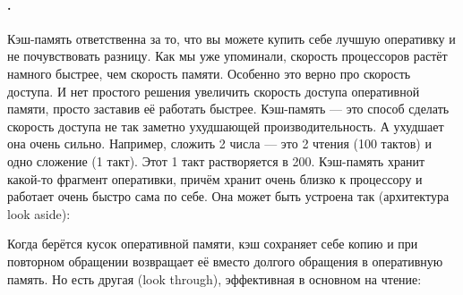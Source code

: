 \documentclass{article}
\begin{document}
    \paragraph{.}
    Кэш-память ответственна за то, что вы можете купить себе лучшую оперативку и не почувствовать разницу. Как мы уже упоминали, скорость процессоров растёт намного быстрее, чем скорость памяти. Особенно это верно про скорость доступа. И нет простого решения увеличить скорость доступа оперативной памяти, просто заставив её работать быстрее. Кэш-память --- это способ сделать скорость доступа не так заметно ухудшающей производительность. А ухудшает она очень сильно. Например, сложить 2 числа --- это 2 чтения (100 тактов) и одно сложение (1 такт). Этот 1 такт растворяется в 200. Кэш-память хранит какой-то фрагмент оперативки, причём хранит очень близко к процессору и работает очень быстро сама по себе. Она может быть устроена так (архитектура look aside):
    \begin{center}
    \end{center}
    Когда берётся кусок оперативной памяти, кэш сохраняет себе копию и при повторном обращении возвращает её вместо долгого обращения в оперативную память. Но есть другая (look through), эффективная в основном на чтение:
    \begin{center}
    \end{center}
\end{document}
